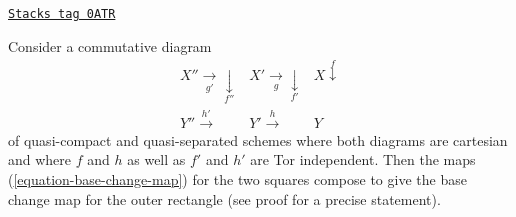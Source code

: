 \begin{lemma}
\label{duality-lemma-compose-base-change-maps-horizontal}
\href{https://stacks.math.columbia.edu/tag/0ATR}{\texttt{Stacks tag 0ATR}}

Consider a commutative diagram
$$
\begin{array}{ccc}X'' \underset{g'}{\longrightarrow}\underset{f''}{\downarrow} & X' \underset{g}{\longrightarrow}\underset{f'}{\downarrow} & X \overset{f}{\downarrow} \\ Y'' \overset{h'}{\longrightarrow} & Y' \overset{h}{\longrightarrow} & Y\end{array}
$$
of quasi-compact and quasi-separated schemes where
both diagrams are cartesian and where $f$ and $h$
as well as $f'$ and $h'$ are Tor independent.
Then the maps (\ref{equation-base-change-map})
for the two squares compose to give the base
change map for the outer rectangle (see proof for a precise statement).
\end{lemma}

